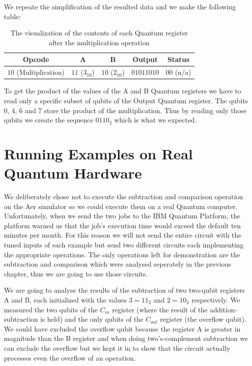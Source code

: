 We repeate the simplification of the resulted data and we make the following table:

\begin{table}[ht]
    \centering
    \begin{tabular}{c|c|c|c|c}
        Opcode & A & B & Output & Status \\
        \hline
        $10$ (Multiplication) & $11$ ($3_{10}$) & $10$ ($2_{10}$) & $01011010$ & $00$ (n/a)\\
    \end{tabular}
    \caption{The visualization of the contents of each Quantum register after the multiplication operation}
\end{table}

To get the product of the values of the A and B Quantum registers we have to read only a specific subset of qubits of the Output Quantum register.
The qubits 0, 4, 6 and 7 store the product of the multiplication. Thus by reading only those qubits we create the sequence $0110_2$ which is what we expected.

\newpage

\section{Running Examples on Real Quantum Hardware}

We deliberately chose not to execute the subtraction and comparison operation on the Aer simulator so we could execute them on a real Quantum computer. Unfortunately, when
we send the two jobs to the IBM Quantum Platform, the platform warned us that the job's execution time would exceed the default ten minutes per month. For this reason we will
not send the entire circuit with the tuned inputs of each example but send two different circuits each implementing the appropriate operations. The only operations left for
demonstration are the subtraction and comparison which were analysed seperately in the previous chapter, thus we are going to use those circuits.

We are going to analyse the results of the subtraction of two two-qubit registers A and B, each initialized with the values $3=11_2$ and $2=10_2$ respectively. We 
measured the two qubits of the $C_{in}$ register (where the result of the addition-subtraction is held) and the only  qubits of the $C_{out}$ register (the overflow qubit).
We could have excluded the overflow qubit because the register A is greater in magnitude than the B register and when doing two's-complement subtraction we can exclude the
overflow but we kept it in to show that the circuit actually processes even the overflow of an operation.

